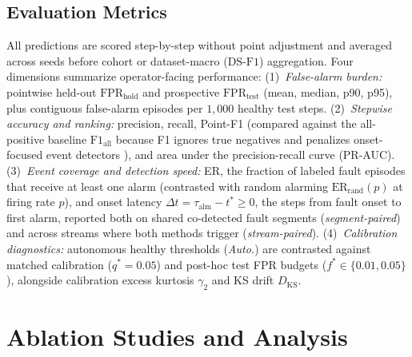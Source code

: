 \documentclass[journal]{IEEEtran}
\begin{document}
\subsection{Evaluation Metrics}
\label{subsec:eval_metrics}
All predictions are scored step-by-step without point adjustment \cite{kim2022towards} and averaged across seeds before cohort or dataset-macro ($\text{DS-F1}$) aggregation. Four dimensions summarize operator-facing performance:
(1)~\emph{False-alarm burden:} pointwise held-out $\text{FPR}_{\text{hold}}$ and prospective $\text{FPR}_{\text{test}}$ (mean, median, p90, p95), plus contiguous false-alarm episodes per $1{,}000$ healthy test steps.
(2)~\emph{Stepwise accuracy and ranking:} precision, recall, Point-F1 (compared against the all-positive baseline $\text{F1}_{\text{all}}$ because F1 ignores true negatives \cite{chicco2020advantages} and penalizes onset-focused event detectors \cite{garg2022evaluation}), and area under the precision-recall curve (PR-AUC).
(3)~\emph{Event coverage and detection speed:} ER, the fraction of labeled fault episodes that receive at least one alarm (contrasted with random alarming $\text{ER}_{\text{rand}}(p)$ at firing rate $p$), and onset latency $\Delta t = \tau_{\text{alm}} - t^* \ge 0$, the steps from fault onset to first alarm, reported both on shared co-detected fault segments (\emph{segment-paired}) and across streams where both methods trigger (\emph{stream-paired}).
(4)~\emph{Calibration diagnostics:} autonomous healthy thresholds (\emph{Auto.}) are contrasted against matched calibration ($q^*=0.05$) and post-hoc test FPR budgets ($f^* \in \{0.01, 0.05\}$), alongside calibration excess kurtosis $\gamma_2$ and KS drift $D_{\text{KS}}$.

\section{Ablation Studies and Analysis}
\label{sec:ablations}
\end{document}
